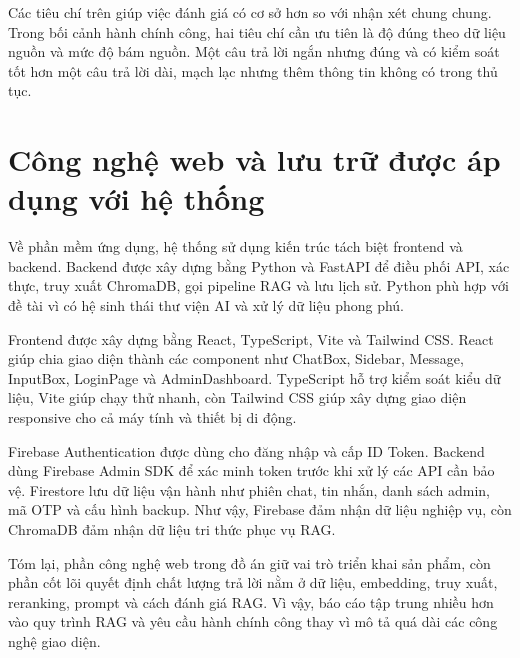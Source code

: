 Các tiêu chí trên giúp việc đánh giá có cơ sở hơn so với nhận xét chung
chung. Trong bối cảnh hành chính công, hai tiêu chí cần ưu tiên là độ
đúng theo dữ liệu nguồn và mức độ bám nguồn. Một câu trả lời ngắn nhưng
đúng và có kiểm soát tốt hơn một câu trả lời dài, mạch lạc nhưng thêm
thông tin không có trong thủ tục.

\section{Công nghệ web và lưu trữ được áp
dụng với hệ
thống}

Về phần mềm ứng dụng, hệ thống sử dụng kiến trúc tách biệt frontend và
backend. Backend được xây dựng bằng Python và FastAPI để điều phối API,
xác thực, truy xuất ChromaDB, gọi pipeline RAG và lưu lịch sử. Python
phù hợp với đề tài vì có hệ sinh thái thư viện AI và xử lý dữ liệu phong
phú.

Frontend được xây dựng bằng React, TypeScript, Vite và Tailwind CSS.
React giúp chia giao diện thành các component như ChatBox, Sidebar,
Message, InputBox, LoginPage và AdminDashboard. TypeScript hỗ trợ kiểm
soát kiểu dữ liệu, Vite giúp chạy thử nhanh, còn Tailwind CSS giúp xây
dựng giao diện responsive cho cả máy tính và thiết bị di động.

Firebase Authentication được dùng cho đăng nhập và cấp ID Token. Backend
dùng Firebase Admin SDK để xác minh token trước khi xử lý các API cần
bảo vệ. Firestore lưu dữ liệu vận hành như phiên chat, tin nhắn, danh
sách admin, mã OTP và cấu hình backup. Như vậy, Firebase đảm nhận dữ
liệu nghiệp vụ, còn ChromaDB đảm nhận dữ liệu tri thức phục vụ RAG.

Tóm lại, phần công nghệ web trong đồ án giữ vai trò triển khai sản phẩm,
còn phần cốt lõi quyết định chất lượng trả lời nằm ở dữ liệu, embedding,
truy xuất, reranking, prompt và cách đánh giá RAG. Vì vậy, báo cáo tập
trung nhiều hơn vào quy trình RAG và yêu cầu hành chính công thay vì mô
tả quá dài các công nghệ giao diện.
